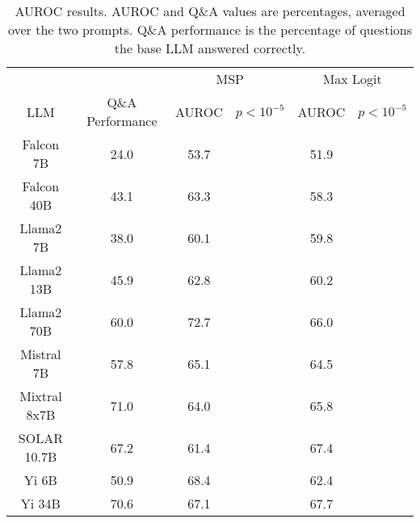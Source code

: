 \begin{table*}
\centering
\begin{tabular}{c|c|c|c|c|c}
& & \multicolumn{2}{c|}{MSP} & \multicolumn{2}{c}{Max Logit} \\ 
LLM & Q\&A Performance & AUROC & $p < 10^{-5}$ & AUROC & $p < 10^{-5}$\\ \hline
Falcon 7B & 24.0 & 53.7 &  & 51.9 & \\
Falcon 40B & 43.1 & 63.3 &  & 58.3 & \\
Llama2 7B & 38.0 & 60.1 &  & 59.8 & \\
Llama2 13B & 45.9 & 62.8 &  & 60.2 & \\
Llama2 70B & 60.0 & 72.7 &  & 66.0 & \\
Mistral 7B & 57.8 & 65.1 &  & 64.5 & \\
Mixtral 8x7B & 71.0 & 64.0 &  & 65.8 & \\
SOLAR 10.7B & 67.2 & 61.4 &  & 67.4 & \\
Yi 6B & 50.9 & 68.4 &  & 62.4 & \\
Yi 34B & 70.6 & 67.1 &  & 67.7 & \\
\hline
\end{tabular}
\caption{AUROC results. AUROC and Q\&A values are percentages, averaged over the two prompts. Q\&A performance is the percentage of questions the base LLM answered correctly.}
\label{tab:auroc}
\end{table*}

